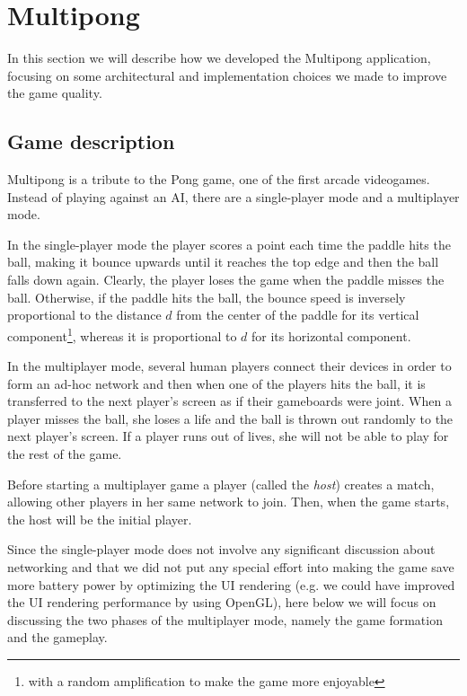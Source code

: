 \section{Multipong} %

In this section we will describe how we developed the Multipong application,
focusing on some architectural and implementation choices we made to improve
the game quality.

\subsection{Game description} %

Multipong is a tribute to the Pong game, one of the first arcade videogames.
Instead of playing against an AI, there are a single-player mode and a
multiplayer mode.

In the single-player mode the player scores a point each time the paddle hits
the ball, making it bounce upwards until it reaches the top edge and then the
ball falls down again. Clearly, the player loses the game when the paddle
misses the ball.
%
%
%
%
%
Otherwise, if the paddle hits the ball, the bounce speed is inversely
proportional to the distance $d$ from the center of the paddle for its
vertical component\footnote{with a random amplification to make the game more
enjoyable}, whereas it is proportional to $d$ for its horizontal component.

In the multiplayer mode, several human players connect their devices in order
to form an ad-hoc network and then when one of the players hits the ball, it is
transferred to the next player's screen as if their gameboards were joint.
When a player misses the ball, she loses a life and the ball is thrown out
randomly to the next player's screen.
If a player runs out of lives, she will not be able to play for the rest of the
game.

Before starting a multiplayer game a player (called the \textit{host}) creates
a match, allowing other players in her same network to join. Then, when the
game starts, the host will be the initial player.

Since the single-player mode does not involve any significant discussion about
networking and that we did not put any special effort into making the game save
more battery power by optimizing the UI rendering (e.g. we could have improved
the UI rendering performance by using OpenGL), here below we will focus on
discussing the two phases of the multiplayer mode, namely the game formation
and the gameplay.

